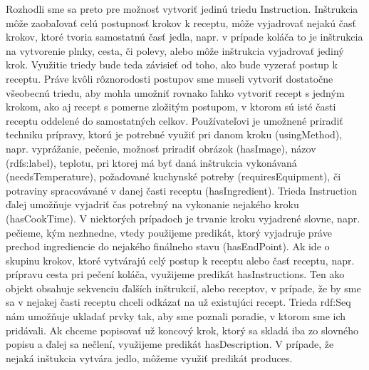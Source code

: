 	Rozhodli sme sa preto pre možnosť vytvoriť jedinú triedu Instruction. Inštrukcia môže zaobaľovať celú postupnosť krokov k receptu, môže vyjadrovať nejakú časť krokov, ktoré tvoria samostatnú časť jedla, napr. v prípade koláča to je inštrukcia na vytvorenie plnky, cesta, či polevy, alebo môže inštrukcia vyjadrovať jediný krok. Využitie triedy bude teda závisieť od toho, ako bude vyzerať postup k receptu. Práve kvôli rôznorodosti postupov sme museli vytvoriť dostatočne všeobecnú triedu, aby mohla umožniť rovnako ľahko vytvoriť recept s jedným krokom, ako aj recept s pomerne zložitým postupom, v ktorom sú isté časti receptu oddelené do samostatných celkov. Používateľovi je umožnené priradiť techniku prípravy, ktorú je potrebné využiť pri danom kroku (usingMethod), napr. vyprážanie, pečenie, možnosť priradiť obrázok (hasImage), názov (rdfs:label), teplotu, pri ktorej má byť daná inštrukcia vykonávaná (needsTemperature), požadované kuchynské potreby (requiresEquipment), či potraviny spracovávané v danej časti receptu (hasIngredient).  Trieda Instruction ďalej umožňuje vyjadriť čas potrebný na vykonanie nejakého kroku (hasCookTime). V niektorých prípadoch je trvanie kroku vyjadrené slovne, napr. pečieme, kým nezhnedne, vtedy použijeme predikát, ktorý vyjadruje práve prechod ingrediencie do nejakého finálneho stavu (hasEndPoint). Ak ide o skupinu krokov, ktoré vytvárajú celý postup k receptu alebo časť receptu, napr. prípravu cesta pri pečení koláča, využijeme predikát hasInstructions. Ten ako objekt obsahuje sekvenciu ďalších inštrukcií, alebo receptov, v prípade, že by sme sa v nejakej časti receptu chceli odkázať na už existujúci recept. Trieda rdf:Seq nám umožňuje ukladať prvky tak, aby sme poznali poradie, v ktorom sme ich pridávali. Ak chceme popisovať už koncový krok, ktorý sa skladá iba zo slovného popisu a ďalej sa nečlení, využijeme predikát hasDescription. V prípade, že nejaká inštukcia vytvára jedlo, môžeme využiť predikát produces.
 

